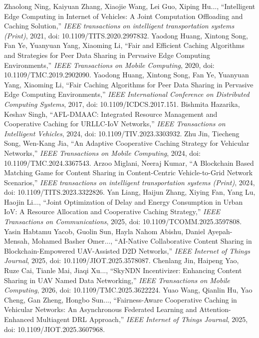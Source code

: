 Zhaolong Ning, Kaiyuan Zhang, Xiaojie Wang, Lei Guo, Xiping Hu..., ``Intelligent Edge Computing in Internet of Vehicles: A Joint Computation Offloading and Caching Solution,'' \textit{IEEE transactions on intelligent transportation systems (Print)}, 2021, doi: 10.1109/TITS.2020.2997832.
Yaodong Huang, Xintong Song, Fan Ye, Yuanyuan Yang, Xiaoming Li, ``Fair and Efficient Caching Algorithms and Strategies for Peer Data Sharing in Pervasive Edge Computing Environments,'' \textit{IEEE Transactions on Mobile Computing}, 2020, doi: 10.1109/TMC.2019.2902090.
Yaodong Huang, Xintong Song, Fan Ye, Yuanyuan Yang, Xiaoming Li, ``Fair Caching Algorithms for Peer Data Sharing in Pervasive Edge Computing Environments,'' \textit{IEEE International Conference on Distributed Computing Systems}, 2017, doi: 10.1109/ICDCS.2017.151.
Bishmita Hazarika, Keshav Singh, ``AFL-DMAAC: Integrated Resource Management and Cooperative Caching for URLLC-IoV Networks,'' \textit{IEEE Transactions on Intelligent Vehicles}, 2024, doi: 10.1109/TIV.2023.3303932.
Zhu Jin, Tiecheng Song, Wen-Kang Jia, ``An Adaptive Cooperative Caching Strategy for Vehicular Networks,'' \textit{IEEE Transactions on Mobile Computing}, 2024, doi: 10.1109/TMC.2024.3367543.
Arzoo Miglani, Neeraj Kumar, ``A Blockchain Based Matching Game for Content Sharing in Content-Centric Vehicle-to-Grid Network Scenarios,'' \textit{IEEE transactions on intelligent transportation systems (Print)}, 2024, doi: 10.1109/TITS.2023.3322826.
Yan Liang, Haijun Zhang, Xiying Fan, Yang Lu, Haojin Li..., ``Joint Optimization of Delay and Energy Consumption in Urban IoV: A Resource Allocation and Cooperative Caching Strategy,'' \textit{IEEE Transactions on Communications}, 2025, doi: 10.1109/TCOMM.2025.3597808.
Yasin Habtamu Yacob, Guolin Sun, Hayla Nahom Abishu, Daniel Ayepah-Mensah, Mohamed Basher Omer..., ``AI-Native Collaborative Content Sharing in Blockchain-Empowered UAV-Assisted D2D Networks,'' \textit{IEEE Internet of Things Journal}, 2025, doi: 10.1109/JIOT.2025.3578087.
Chenlang Jin, Haipeng Yao, Ruze Cai, Tianle Mai, Jiaqi Xu..., ``SkyNDN Incentivizer: Enhancing Content Sharing in UAV Named Data Networking,'' \textit{IEEE Transactions on Mobile Computing}, 2026, doi: 10.1109/TMC.2025.3622224.
Yuao Wang, Qianlin Hu, Yao Cheng, Gan Zheng, Hongbo Sun..., ``Fairness-Aware Cooperative Caching in Vehicular Networks: An Asynchronous Federated Learning and Attention-Enhanced Multiagent DRL Approach,'' \textit{IEEE Internet of Things Journal}, 2025, doi: 10.1109/JIOT.2025.3607968.

